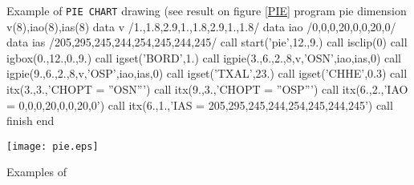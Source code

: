 \begin{XMPt}{Example of {\tt PIE CHART} drawing (see result on figure \ref{PIE}}
      program  pie 
      dimension v(8),iao(8),ias(8)
      data v /1.,1.8,2.9,1.,1.8,2.9,1.,1.8/
      data iao /0,0,0,20,0,0,20,0/
      data ias /205,295,245,244,254,245,244,245/
      call start('pie',12.,9.)
      call isclip(0)
      call igbox(0.,12.,0.,9.)
      call igset('BORD',1.)
      call igpie(3.,6.,2.,8,v,'OSN',iao,ias,0)
      call igpie(9.,6.,2.,8,v,'OSP',iao,ias,0)
      call igset('TXAL',23.)
      call igset('CHHE',0.3)
      call itx(3.,3.,'CHOPT = ''OSN''')
      call itx(9.,3.,'CHOPT = ''OSP''')
      call itx(6.,2.,'IAO = 0,0,0,20,0,0,20,0')
      call itx(6.,1.,'IAS = 205,295,245,244,254,245,244,245')
      call finish
      end
\end{XMPt}

\begin{Fighere}
\begin{center}
\texttt{[image: pie.eps]}
\end{center}
\caption{Examples of \protect{}}
\label{PIE}
\end{Fighere}
\clearpage
 

